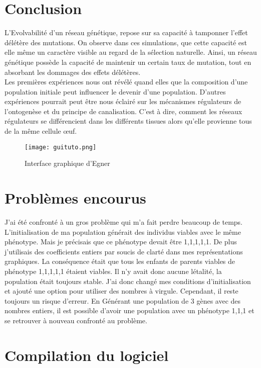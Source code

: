 \documentclass{article}
\begin{document}
	\section{Conclusion}
	L'Evolvabilité d'un réseau génétique, repose sur sa capacité à tamponner l'effet délétère des mutations. On observe dans ces simulations, que cette capacité est elle même un caractère visible au regard de la sélection naturelle. Ainsi, un réseau génétique possède la capacité de maintenir un certain taux de mutation, tout en absorbant les dommages des effets délétères. \\
	Les premières expériences nous ont révélé quand elles que la composition d'une population initiale peut influencer le devenir d'une population.  D'autres expériences pourrait peut être nous éclairé sur les mécanismes régulateurs de l'ontogenèse et du principe de canalisation. C'est à dire, comment les réseaux régulateurs se différencient dans les différents tissues alors qu'elle provienne tous de la même cellule œuf.


	\begin{figure}[h]
	\centering
	\caption[test]{Interface graphique d'Egner}
	\texttt{[image: guituto.png]}
	\label{gui}

	\end{figure}

	\appendix
	\section{Problèmes encourus}

	J'ai été confronté à un gros problème qui m'a fait perdre beaucoup de temps. L’initialisation de ma population générait des individus viables avec le même phénotype. Mais je précisais que ce phénotype devait être {1,1,1,1,1}. De plus j'utilisais des coefficients entiers par soucis de clarté dans mes représentations graphiques. La conséquence était que tous les enfants de parents viables de phénotype {1,1,1,1,1} étaient viables. Il n'y avait donc aucune létalité, la population était toujours stable. 
	J'ai donc changé mes conditions d’initialisation et ajouté une option pour utiliser des nombres à virgule. Cependant, il reste toujours un risque d'erreur. En Générant une population de 3 gènes avec des nombres entiers, il est possible d'avoir une population avec un phénotype {1,1,1} et se retrouver à nouveau confronté au problème.  


	\section{Compilation du logiciel}
\end{document}
